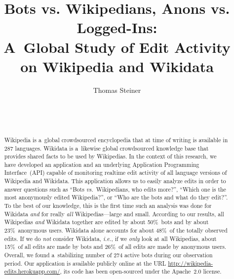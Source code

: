 \documentclass{sig-alternate}
\newcommand{\inlinelistingsize}{\fontsize{8pt}{11pt}}
\let\oldurl\url
\renewcommand{\url}[1]{\inlinelistingsize\oldurl{#1}}
\begin{document}
%

\title{Bots vs. Wikipedians, Anons vs. Logged-Ins:\\ A~Global Study of Edit Activity on Wikipedia and Wikidata}


\author{
\alignauthor
Thomas Steiner\\
       \\
       \\
       \\
}

\maketitle
\begin{abstract}
Wikipedia is a~global crowdsourced encyclopedia
that at time of writing is available in 287 languages.
Wikidata is a~likewise global crowdsourced knowledge base
that provides shared facts to be used by Wikipedias.
In the context of this research, we have developed
an application and an underlying
Application Programming Interface~(API) capable of monitoring
realtime edit activity of all language versions
of Wikipedia and Wikidata.
This application allows us to easily analyze edits
in order to answer questions such as
``Bots \emph{vs.}\ Wikipedians, who edits more?'',
``Which one is the most anonymously edited Wikipedia?'',
or ``Who are the bots and what do they edit?''.
To the best of our knowledge,
this is the first time such an analysis
was done for Wikidata \emph{and}
for really \emph{all} Wikipedias---large and small.
According to our results, all Wikipedias \emph{and} Wikidata together
are edited by about 50\%~bots and by about 23\%~anonymous users.
Wikidata alone accounts for about 48\%~of the totally observed edits.
If we do \emph{not} consider Wikidata, \emph{i.e.},
if we \emph{only} look at all Wikipedias,
about 15\%~of all edits are made by bots
and 26\%~of all edits are made by anonymous users.
Overall, we found a~stabilizing number of 274 active bots
during our observation period.
Our application is available publicly online at the URL
\url{http://wikipedia-edits.herokuapp.com/},
its code has been open-sourced under the Apache~2.0 license.
\end{abstract}
\end{document}
